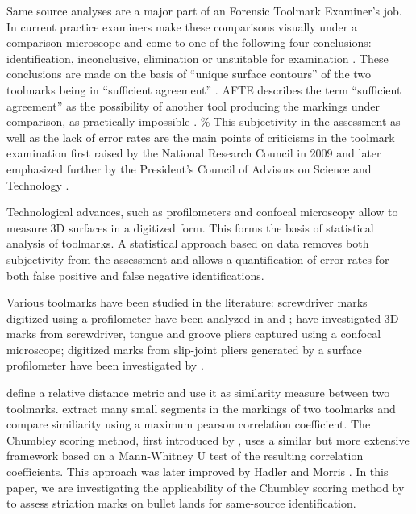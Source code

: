 \documentclass[12pt]{article}
\begin{document}
Same source analyses are a major part of an Forensic Toolmark Examiner's
job. In current practice examiners make these comparisons visually under
a comparison microscope and come to one of the following four
conclusions: identification, inconclusive, elimination or unsuitable for
examination \citet{afte-website-2}. These conclusions are made on the
basis of ``unique surface contours'' of the two toolmarks being in
``sufficient agreement'' \citep{afte-toolmarks1998}. AFTE describes the
term ``sufficient agreement'' as the possibility of another tool
producing the markings under comparison, as practically impossible
\citep{afte-toolmarks1998} \citep{afte-website}.
\%
This subjectivity in the assessment as well as the lack of error rates
are the main points of criticisms in the toolmark examination first
raised by the National Research Council in 2009 \citep{NAS:2009} and
later emphasized further by the President's Council of Advisors on
Science and Technology \citep{pcast2016}.

Technological advances, such as profilometers and confocal microscopy
allow to measure 3D surfaces \citep{vorburger2016} in a digitized form.
This forms the basis of statistical analysis of toolmarks. A statistical
approach based on data removes both subjectivity from the assessment and
allows a quantification of error rates for both false positive and false
negative identifications.

Various toolmarks have been studied in the literature: screwdriver marks
digitized using a profilometer have been analyzed in
\citet{manytoolmarks1} and \citet{chumbley}; \citet{manytoolmarks2} have
investigated 3D marks from screwdriver, tongue and groove pliers
captured using a confocal microscope; digitized marks from slip-joint
pliers generated by a surface profilometer have been investigated by
\citet{afte-chumbley}.

\citet{manytoolmarks2} define a relative distance metric and use it as
similarity measure between two toolmarks. \citet{manytoolmarks1} extract
many small segments in the markings of two toolmarks and compare
similiarity using a maximum pearson correlation coefficient. The
Chumbley scoring method, first introduced by \citet{chumbley}, uses a
similar but more extensive framework based on a Mann-Whitney U test of
the resulting correlation coefficients. This approach was later improved
by Hadler and Morris \citep{hadler}.
 In this paper,
we are investigating the applicability of the Chumbley scoring method by
\citet{hadler} to assess striation marks on bullet lands for same-source
identification.
\end{document}
